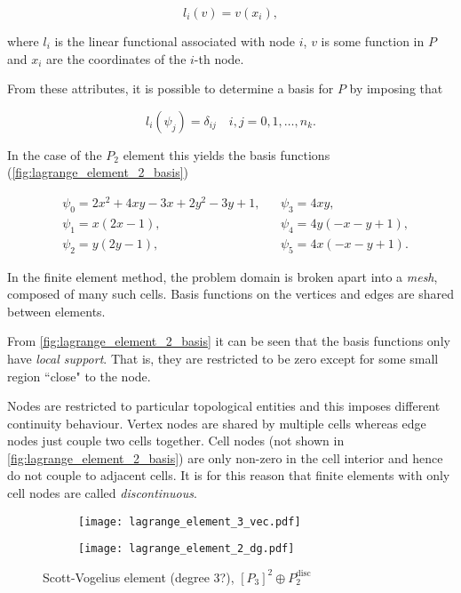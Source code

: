 \documentclass[thesis]{subfiles}
\begin{document}
\begin{equation*}
  l_i(v) = v(x_i),
\end{equation*}

where $l_i$ is the linear functional associated with node $i$, $v$ is some function in $P$ and $x_i$ are the coordinates of the $i$-th node.

From these attributes, it is possible to determine a basis for $P$ by imposing that

\begin{equation*}
  l_i(\psi_j) = \delta_{ij} \quad i, j = 0, 1, \dots, n_k.
\end{equation*}

In the case of the $P_2$ element this yields the basis functions (\cref{fig:lagrange_element_2_basis})

\begin{align*}
  &\psi_0 = 2x^2 + 4xy - 3x + 2y^2-3y+1,
  &
  &\psi_3 = 4xy, \\
  &\psi_1 = x(2x-1),
  &
  &\psi_4 = 4y(-x-y+1), \\
  &\psi_2 = y(2y-1),
  &
  &\psi_5 = 4x(-x-y+1).
\end{align*}

In the finite element method, the problem domain is broken apart into a \textit{mesh}, composed of many such cells.
Basis functions on the vertices and edges are shared between elements.

From \cref{fig:lagrange_element_2_basis} it can be seen that the basis functions only have \textit{local support}.
That is, they are restricted to be zero except for some small region ``close" to the node.

Nodes are restricted to particular topological entities and this imposes different continuity behaviour.
Vertex nodes are shared by multiple cells whereas edge nodes just couple two cells together.
Cell nodes (not shown in \cref{fig:lagrange_element_2_basis}) are only non-zero in the cell interior and hence do not couple to adjacent cells.
It is for this reason that finite elements with only cell nodes are called \textit{discontinuous}.

\begin{figure}
  \centering
  \hfill
  \begin{subfigure}{.4\textwidth}
    \texttt{[image: lagrange\_element\_3\_vec.pdf]}
    \label{fig:scott_vogelius_element_P3}
  \end{subfigure}
  \hfill
  \begin{subfigure}{.4\textwidth}
    \texttt{[image: lagrange\_element\_2\_dg.pdf]}
  \end{subfigure}
  \hfill
  \caption{Scott-Vogelius element (degree 3?), $[P_3]^2 \oplus P_2^\mathrm{disc}$}
  \label{fig:scott_vogelius_element}
\end{figure}
\end{document}
